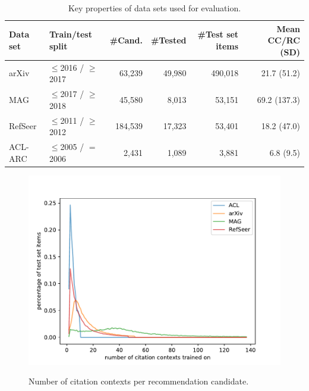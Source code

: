 \begin{table}[]
\centering
    \caption{Key properties of data sets used for evaluation.}
    \label{tab:datasetprops}
\begin{center}
    \begin{tabular}{llrrrr}
    \toprule %
    Data set & Train/test split & \#Cand. & \#Tested & \#Test set items & Mean CC/RC (SD)\\ 
    \midrule
    arXiv & $\le$2016 / $\ge$2017 & 63,239 & 49,980 & 490,018 & 21.7 (\hphantom{1}51.2) \\
    MAG & $\le$2017 / $\ge$2018 & 45,580 & 8,013 & 53,151 & 69.2 (137.3) \\
    RefSeer & $\le$2011 / $\ge$2012 & 184,539 & 17,323 & 53,401 & 18.2 (\hphantom{1}47.0)\\
    ACL-ARC & $\le$2005 / $=$2006 & 2,431 & 1,089 & 3,881 & \hphantom{1}6.8 (\hphantom{10}9.5) \\
    \bottomrule
    \end{tabular}
\end{center}
\end{table}

\begin{figure}
  \centering
    \includegraphics[width=.8\textwidth]{figures/evaluation/comparison_contexts_per_cited_doc.pdf}
  \label{fig:evalcomp}
  \caption{Number of citation contexts per recommendation candidate.}
\end{figure}


